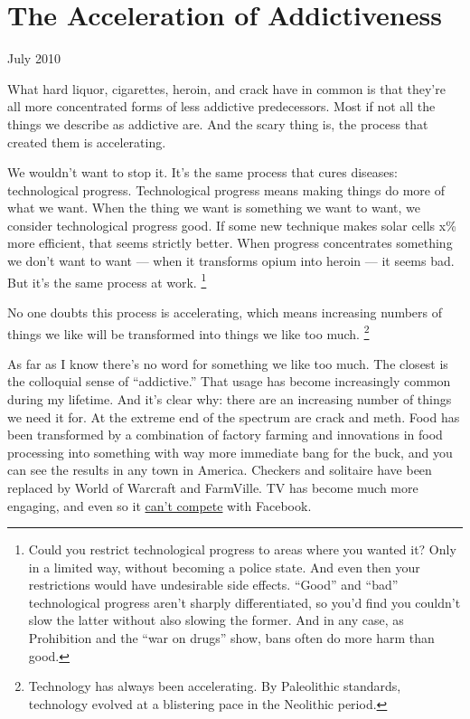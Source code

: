 \chapter{The Acceleration of Addictiveness}

July 2010

What hard liquor, cigarettes, heroin, and crack have in common is that
they're all more concentrated forms of less addictive predecessors. Most
if not all the things we describe as addictive are. And the scary thing
is, the process that created them is accelerating.

We wouldn't want to stop it. It's the same process that cures diseases:
technological progress. Technological progress means making things do
more of what we want. When the thing we want is something we want to
want, we consider technological progress good. If some new technique
makes solar cells x\% more efficient, that seems strictly better. When
progress concentrates something we don't want to want --- when it
transforms opium into heroin --- it seems bad. But it's the same process
at work. \footnote{Could you restrict technological progress to areas where you
wanted it? Only in a limited way, without becoming a police state. And
even then your restrictions would have undesirable side effects.
``Good'' and ``bad'' technological progress aren't sharply
differentiated, so you'd find you couldn't slow the latter without also
slowing the former. And in any case, as Prohibition and the ``war on
drugs'' show, bans often do more harm than good.}

No one doubts this process is accelerating, which means increasing
numbers of things we like will be transformed into things we like too
much. \footnote{Technology has always been accelerating. By Paleolithic
standards, technology evolved at a blistering pace in the Neolithic
period.}

As far as I know there's no word for something we like too much. The
closest is the colloquial sense of ``addictive.'' That usage has become
increasingly common during my lifetime. And it's clear why: there are an
increasing number of things we need it for. At the extreme end of the
spectrum are crack and meth. Food has been transformed by a combination
of factory farming and innovations in food processing into something
with way more immediate bang for the buck, and you can see the results
in any town in America. Checkers and solitaire have been replaced by
World of Warcraft and FarmVille. TV has become much more engaging, and
even so it \href{convergence.html}{can't compete} with Facebook.

